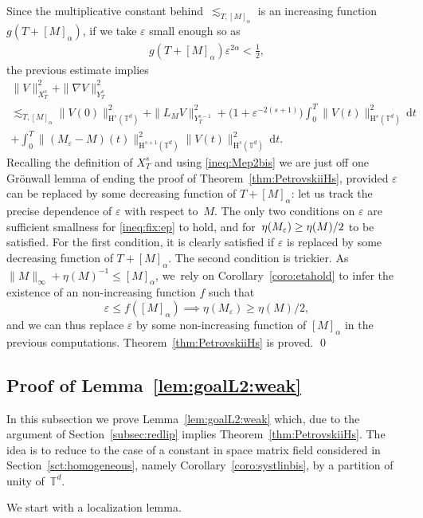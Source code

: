 \documentclass[10pt]{amsart}
\theoremstyle{definition}
\newcommand\T{\mathbb{T}}
\newcommand\dd{\mathrm{d}}
\renewcommand\H{\mathrm{H}}
\let\ep\varepsilon
\begin{document}
Since the multiplicative constant behind~$ \lesssim_{T,[M]_\alpha}$ is an increasing function~$ g(T+[M]_\alpha)$, if we take $\ep$ small enough so as\vspace*{-3pt}
\begin{align}\label{ineq:fix:ep}
g(T+[M]_\alpha)\ep^{2\alpha}<\frac12,
\end{align}
the previous estimate implies\vspace*{-5pt}
\begin{multline}\label{ineq:1+Mep}
\|V\|_{X_T^s}^2 + \|\nabla V\|_{Y_T^s}^2\\
\lesssim_{T,[M]_\alpha} \|V(0)\|_{\H^s(\T^d)}^2+\| L_{M}V \|_{Y_T^{s-1}}^2 + \bigl(1+ \ep^{-2(s+1)}\bigr)\int_0^T \|V(t)\|_{\H^s(\T^d)}^2\,\dd t \\
+ \int_0^T \|(M_\ep-M)(t)\|_{\H^{s+1}(\T^d)}^2\|V(t)\|_{\H^s(\T^d)}^2\,\dd t.
\end{multline}
Recalling the definition of $X_T^s$ and using \eqref{ineq:Mep2bis} we are just off one Grönwall lemma of ending the proof of Theorem~\ref{thm:PetrovskiiHs}, provided $\ep$ can be replaced by some decreasing function of $T+[M]_\alpha$: let us track the precise dependence of $\ep$ with respect to~$M$. The only two conditions on $\ep$ are sufficient smallness for \eqref{ineq:fix:ep} to hold, and for~$\eta(M_\ep)\geq\nobreak \eta(M)/2$ to be satisfied. For the first condition, it is clearly satisfied if $\ep$ is replaced by some decreasing function of $T+[M]_\alpha$. The second condition is trickier. As $\|M\|_\infty+\eta(M)^{-1}\leq [M]_\alpha$, we~rely on Corollary~\ref{coro:etahold} to infer the existence of an non-increasing function $f$ such that
\[
\ep\leq f([M]_\alpha) \implies\eta(M_\ep)\geq \eta(M)/2,
\]
and we can thus replace $\ep$ by some non-increasing function of $[M]_\alpha$ in the previous computations. Theorem~\ref{thm:PetrovskiiHs} is proved. \qed

\subsection{Proof of Lemma~\ref{lem:goalL2:weak}}\label{subsec:proof_lemma}
In this subsection we prove Lemma~\ref{lem:goalL2:weak} which, due to the argument of Section~\ref{subsec:redlip} implies Theorem~\ref{thm:PetrovskiiHs}. The idea is to reduce to the case of a constant in space matrix field considered in Section~\ref{sct:homogeneous}, namely Corollary~\ref{coro:systlinbis}, by a partition of unity of~$ \T^d$.

We start with a localization lemma.
\end{document}
